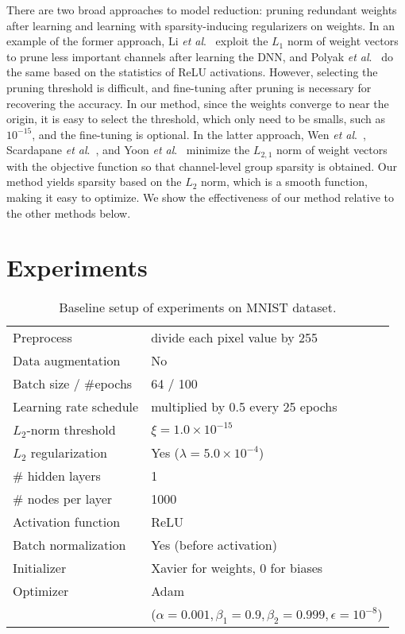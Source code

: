 \documentclass[conference]{IEEEtran}
\newcommand{\etal}{\textit{et al}.}
\begin{document}
There are two broad approaches to model reduction: pruning redundant weights after learning and learning with sparsity-inducing regularizers on weights.
In an example of the former approach, Li \etal~\cite{Li_2017} exploit the $L_1$ norm of weight vectors to prune less important channels after learning the DNN, and Polyak \etal~\cite{Polyak_2015} do the same based on the statistics of ReLU activations. 
However, selecting the pruning threshold is difficult, and fine-tuning after pruning is necessary for recovering the accuracy. 
In our method, since the weights converge to near the origin, it is easy to select the threshold, which only need to be smalls, such as $10^{-15}$, and the fine-tuning is optional.
In the latter approach, Wen \etal~\cite{Wen_2016}, Scardapane \etal~\cite{Scardapane_2017}, and Yoon \etal~\cite{Yoon_2017} minimize the $L_{2,1}$ norm of weight vectors with the objective function so that channel-level group sparsity is obtained.
Our method yields sparsity based on the $L_2$ norm, which is a smooth function, making it easy to optimize. We show the effectiveness of our method relative to the other methods \cite{Wen_2016}\cite{Scardapane_2017} below. 

\section{Experiments}\label{sec:experiments}

\begin{table}[t]
\begin{center}
	\caption{Baseline setup of experiments on MNIST dataset.}
	\begin{tabular}{l|l} \hline
	Preprocess				&	divide each pixel value by 255													\\
	Data augmentation		&	No																				\\
	Batch size / \#epochs	&	64 / 100																		\\
	Learning rate schedule	&	multiplied by 0.5 every 25 epochs												\\
	$L_2$-norm threshold	&	$\xi = 1.0 \times 10^{-15}$														\\
	$L_2$ regularization	&	Yes ($\lambda = 5.0 \times 10^{-4}$)											\\
	\# hidden layers		&	1																				\\
	\# nodes per layer		&	1000																			\\
	Activation function		&	ReLU																			\\
	Batch normalization		&	Yes (before activation)															\\
	Initializer				&	Xavier \cite{Glorot_2010} for weights, 0 for biases								\\
	Optimizer				&	Adam																			\\
							&	{\scriptsize($\alpha = 0.001, \beta_1=0.9, \beta_2=0.999, \epsilon=10^{-8}$)}	\\ \hline
	\end{tabular}
	\label{tbl:setup_mnist}
\end{center}
\end{table}
\end{document}
